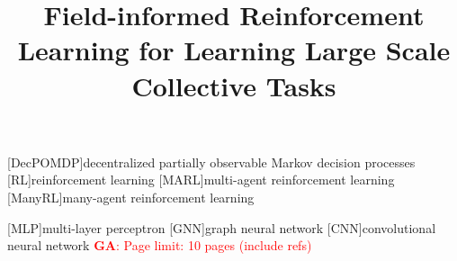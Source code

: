 \documentclass[conference]{IEEEtran}
\begin{document}
%
\title{Field-informed Reinforcement Learning for Learning Large Scale Collective Tasks} %
%

\author{

\and
{}
\and
{}
}
%
\maketitle              %
%

\newcommand{\meta}[3]{\textcolor{#1}{\textbf{#2}: #3}}
\newcommand{\ga}[1]{\meta{red}{GA}{#1}}
\newcommand{\lukas}[1]{\meta{purple}{Lukas}{#1}}
\newcommand{\mv}[1]{\meta{green}{MV}{#1}}
[DecPOMDP]{decentralized partially observable Markov decision processes}
[RL]{reinforcement learning}
[MARL]{multi-agent reinforcement learning}
[ManyRL]{many-agent reinforcement learning}

[MLP]{multi-layer perceptron}
[GNN]{graph neural network}
[CNN]{convolutional neural network}
\ga{Page limit: 10 pages (include refs)}
\end{document}
